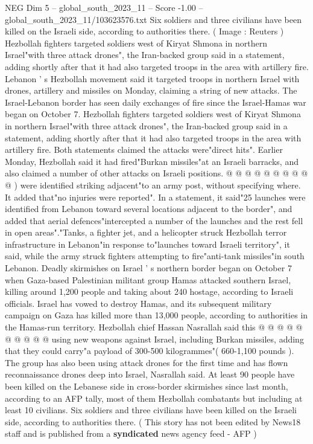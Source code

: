 \begin{textsample}{NEG Dim 5 – global\_south\_2023\_11 – Score -1.00 – global\_south\_2023\_11/103623576.txt}  \label{ex:f5_neg_172}
Six soldiers and three civilians have been killed on the Israeli side, according to authorities there. ( Image : Reuters ) Hezbollah fighters targeted soldiers west of Kiryat Shmona in northern Israel"with three attack drones", the Iran-backed group said in a statement, adding shortly after that it had also targeted troops in the area with artillery fire.
Lebanon ' s Hezbollah movement said it targeted troops in northern Israel with drones, artillery and missiles on Monday, claiming a string of new attacks.
The Israel-Lebanon border has seen daily exchanges of fire since the Israel-Hamas war began on October 7.
Hezbollah fighters targeted soldiers west of Kiryat Shmona in northern Israel"with three attack drones", the Iran-backed group said in a statement, adding shortly after that it had also targeted troops in the area with artillery fire.
Both statements claimed the attacks were"direct hits".
Earlier Monday, Hezbollah said it had fired"Burkan missiles"at an Israeli barracks, and also claimed a number of other attacks on Israeli positions. @ @ @ @ @ @ @ @ @ @ ) were identified striking adjacent"to an army post, without specifying where.
It added that"no injuries were reported".
In a statement, it said"25 launches were identified from Lebanon toward several locations adjacent to the border", and added that aerial defences"intercepted a number of the launches and the rest fell in open areas"."Tanks, a fighter jet, and a helicopter struck Hezbollah terror infrastructure in Lebanon"in response to"launches toward Israeli territory", it said, while the army struck fighters attempting to fire"anti-tank missiles"in south Lebanon.
Deadly skirmishes on Israel ' s northern border began on October 7 when Gaza-based Palestinian militant group Hamas attacked southern Israel, killing around 1,200 people and taking about 240 hostage, according to Israeli officials.
Israel has vowed to destroy Hamas, and its subsequent military campaign on Gaza has killed more than 13,000 people, according to authorities in the Hamas-run territory.
Hezbollah chief Hassan Nasrallah said this @ @ @ @ @ @ @ @ @ @ using new weapons against Israel, including Burkan missiles, adding that they could carry"a payload of 300-500 kilogrammes"( 660-1,100 pounds ).
The group has also been using attack drones for the first time and has flown reconnaissance drones deep into Israel, Nasrallah said.
At least 90 people have been killed on the Lebanese side in cross-border skirmishes since last month, according to an AFP tally, most of them Hezbollah combatants but including at least 10 civilians.
Six soldiers and three civilians have been killed on the Israeli side, according to authorities there. ( This story has not been edited by News18 staff and is published from a \textbf{syndicated} news agency feed - AFP )

\end{textsample}
